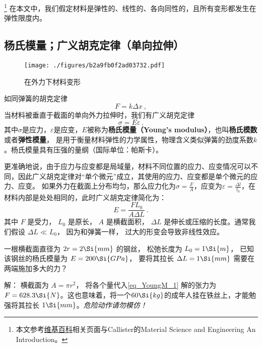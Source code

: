 
\begin{issues}
\issueDraft
\end{issues}

\footnote{本文参考\href{https://en.wikipedia.org/wiki/Young's_modulus}{维基百科}相关页面与Callister的Material Science and Engineering An Introduction。}
在本文中，我们假定材料是弹性的、线性的、各向同性的，且所有变形都发生在弹性限度内。

\subsection{杨氏模量；广义胡克定律（单向拉伸）}
\begin{figure}[ht]
\centering
\texttt{[image: ./figures/b2a9fb0f2ad03732.pdf]}
\caption{在外力下材料变形} \label{fig_YoungM_1}
\end{figure}

如同弹簧的胡克定律
$$F=k \Delta x~,$$
当材料被垂直于截面的单向外力拉伸时，我们有广义胡克定律
\begin{equation}
\sigma = E \varepsilon~.
\end{equation}
其中$\sigma$是应力，$\varepsilon$是应变，$E$被称为\textbf{杨氏模量（Young's modulus）}，也叫\textbf{杨氏模数}或者\textbf{弹性模量}， 是用于衡量材料弹性的力学属性，物理含义类似弹簧的劲度系数$k$。杨氏模量具有压强的量纲（国际单位：帕斯卡）。

更准确地说，由于应力与应变都是局域量，材料不同位置的应力、应变情况可以不同，因此广义胡克定律对“单个微元”成立，其使用的应力、应变都是单个微元的应力、应变。%
如果外力在截面上分布均匀，那么应力化为$\sigma=\frac{F}{A}$，应变为$\varepsilon=\frac{\Delta l}{l_0}$，在材料内部是处处相同的，此时广义胡克定律简化为：%
\begin{equation}\label{eq_YoungM_1}
E = \frac{FL_0}{A\Delta L}~.
\end{equation}
其中 $F$ 是受力， $L_0$ 是原长， $A$ 是横截面积， $\Delta L$ 是伸长或压缩的长度。通常我们假设 $\Delta L \ll L_0$， 因为和弹簧一样， 过大的形变会导致非线性效应。

\begin{example}{}
一根横截面直径为 $2r = 2\Si{mm}$ 的钢丝， 松弛长度为 $L_0 = 1\Si{m}$， 已知该钢丝的杨氏模量为 $E = 200\Si{GPa}$， 要将其拉长 $\Delta L = 1\Si{mm}$ 需要在两端施加多大的力？

解： 横截面为 $A = \pi r^2$， 将各个量代入\autoref{eq_YoungM_1} 解的张力为 $F = 628.3\Si{N}$。这也意味着，将一个$60 \Si{kg}$的成年人挂在铁丝上，才能勉强将其拉长 $1\Si{mm}$。\textsl{危险动作请勿模仿！}
\end{example}


